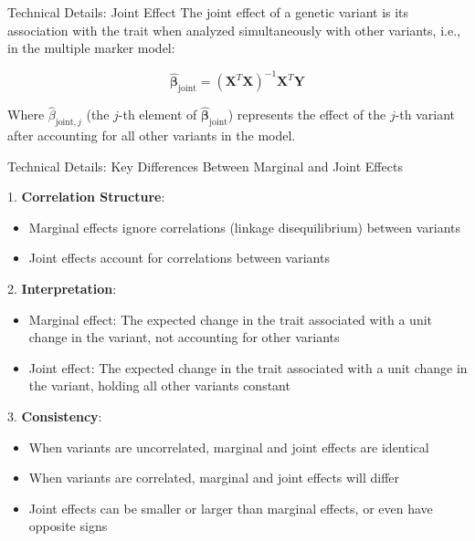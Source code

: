\begin{frame}{Technical Details: Joint Effect}
The joint effect of a genetic variant is its association with the trait when analyzed simultaneously with other variants, i.e., in the multiple marker model:

$$
\hat{\boldsymbol{\beta}}_{\text{joint}} = (\mathbf{X}^T\mathbf{X})^{-1}\mathbf{X}^T\mathbf{Y}
$$

Where $\hat{\beta}_{\text{joint},j}$ (the $j$-th element of $\hat{\boldsymbol{\beta}}_{\text{joint}}$) represents the effect of the $j$-th variant after accounting for all other variants in the model.

\end{frame}

\begin{frame}{Technical Details: Key Differences Between Marginal and Joint Effects}

1. \textbf{Correlation Structure}: 
\begin{itemize}
\item Marginal effects ignore correlations (linkage disequilibrium) between variants
\item Joint effects account for correlations between variants
\end{itemize}

2. \textbf{Interpretation}:
\begin{itemize}
\item Marginal effect: The expected change in the trait associated with a unit change in the variant, not accounting for other variants
\item Joint effect: The expected change in the trait associated with a unit change in the variant, holding all other variants constant
\end{itemize}

3. \textbf{Consistency}:
\begin{itemize}
\item When variants are uncorrelated, marginal and joint effects are identical
\item When variants are correlated, marginal and joint effects will differ
\item Joint effects can be smaller or larger than marginal effects, or even have opposite signs
\end{itemize}
\end{frame}


